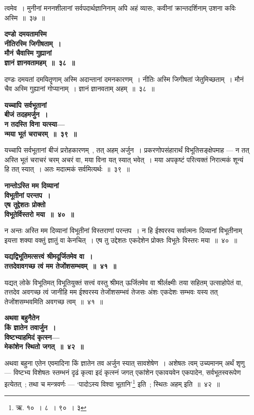 त्वमेव~। मुनीनां मननशीलानां सर्वपदार्थज्ञानिनाम् अपि अहं व्यासः, कवीनां क्रान्तदर्शिनाम् उशना कविः अस्मि~॥~३७~॥\par
 \begin{center}{\bfseries दण्डो दमयतामस्मि\\ नीतिरस्मि जिगीषताम्~।\\मौनं चैवास्मि गुह्यानां\\ ज्ञानं ज्ञानवतामहम्~॥~३८~॥}\end{center} 
दण्डः दमयतां दमयितॄणाम् अस्मि अदान्तानां दमनकारणम्~। नीतिः अस्मि जिगीषतां जेतुमिच्छताम्~। मौनं चैव अस्मि गुह्यानां गोप्यानाम्~। ज्ञानं ज्ञानवताम् अहम्~॥~३८~॥\par
 \begin{center}{\bfseries यच्चापि सर्वभूतानां\\ बीजं तदहमर्जुन~।\\न तदस्ति विना यत्स्या—\\ न्मया भूतं चराचरम्~॥~३९~॥}\end{center} 
यच्चापि सर्वभूतानां बीजं प्ररोहकारणम्~, तत् अहम् अर्जुन~। प्रकरणोपसंहारार्थं विभूतिसङ्क्षेपमाह — न तत् अस्ति भूतं चराचरं चरम् अचरं वा, मया विना यत् स्यात् भवेत्~। मया अपकृष्टं परित्यक्तं निरात्मकं शून्यं हि तत् स्यात्~। अतः मदात्मकं सर्वमित्यर्थः~॥~३९~॥\par
 \begin{center}{\bfseries नान्तोऽस्ति मम दिव्यानां\\ विभूतीनां परन्तप~।\\एष तूद्देशतः प्रोक्तो\\ विभूतेर्विस्तरो मया~॥~४०~॥}\end{center} 
न अन्तः अस्ति मम दिव्यानां विभूतीनां विस्तराणां परन्तप~। न हि ईश्वरस्य सर्वात्मनः दिव्यानां विभूतीनाम् इयत्ता शक्या वक्तुं ज्ञातुं वा केनचित्~। एष तु उद्देशतः एकदेशेन प्रोक्तः विभूतेः विस्तरः मया~॥~४०~॥\par
 \begin{center}{\bfseries यद्यद्विभूतिमत्सत्त्वं श्रीमदूर्जितमेव वा~।\\तत्तदेवावगच्छ त्वं मम तेजोंशसम्भवम्~॥~४१~॥}\end{center} 
यद्यत् लोके विभूतिमत् विभूतियुक्तं सत्त्वं वस्तु श्रीमत् ऊर्जितमेव वा श्रीर्लक्ष्मीः तया सहितम् उत्साहोपेतं वा, तत्तदेव अवगच्छ त्वं जानीहि मम ईश्वरस्य तेजोंशसम्भवं तेजसः अंशः एकदेशः सम्भवः यस्य तत् तेजोंशसम्भवमिति अवगच्छ त्वम्~॥~४१~॥\par
 \begin{center}{\bfseries अथवा बहुनैतेन\\ किं ज्ञातेन तवार्जुन~।\\विष्टभ्याहमिदं कृत्स्न—\\ मेकांशेन स्थितो जगत्~॥~४२~॥}\end{center} 
अथवा बहुना एतेन एवमादिना किं ज्ञातेन तव अर्जुन स्यात् सावशेषेण~। अशेषतः त्वम् उच्यमानम् अर्थं शृणु — विष्टभ्य विशेषतः स्तम्भनं दृढं कृत्वा इदं कृत्स्नं जगत् एकांशेन एकावयवेन एकपादेन, सर्वभूतस्वरूपेण इत्येतत्~; तथा च मन्त्रवर्णः — ‘पादोऽस्य विश्वा भूतानि’\footnote{ऋ. १०~। ८~। ९०~। ३} इति~; स्थितः अहम् इति~॥~४२~॥\par
 
